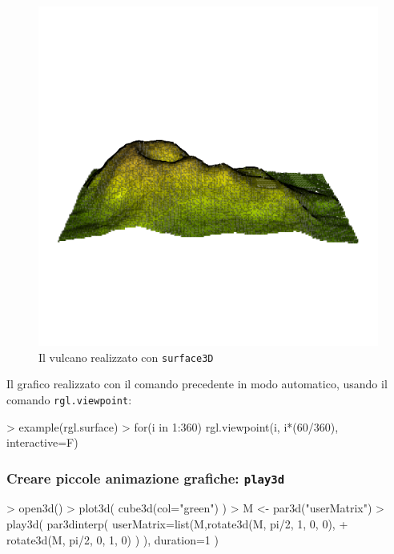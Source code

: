\documentclass[onecolumn,11pt]{book}
\begin{document}
\begin{figure}[htbp]
\begin{center}
\includegraphics[scale=0.8]{../grafici/vulcano.pdf}
\caption{Il vulcano realizzato con \texttt{surface3D}}
\label{default}
\end{center}
\end{figure}


Il grafico realizzato con il comando precedente in modo automatico, usando il comando \texttt{rgl.viewpoint}:

\begin{Schunk}
\begin{Sinput}
> example(rgl.surface)
> for(i in 1:360) {rgl.viewpoint(i, i*(60/360), interactive=F)}
\end{Sinput}
\end{Schunk}
 \subsubsection{Creare piccole animazione grafiche: \texttt{play3d}}

\begin{Schunk}
\begin{Sinput}
> open3d()
> plot3d( cube3d(col="green") )
> M <-  par3d("userMatrix")
> play3d( par3dinterp( userMatrix=list(M,rotate3d(M, pi/2, 1, 0, 0),
+ rotate3d(M, pi/2, 0, 1, 0) ) ), duration=1 )
\end{Sinput}
\end{Schunk}
\end{document}
